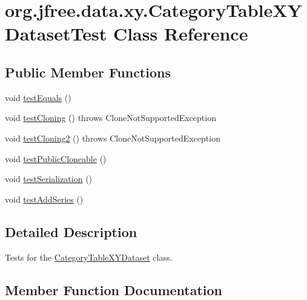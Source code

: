 \hypertarget{classorg_1_1jfree_1_1data_1_1xy_1_1_category_table_x_y_dataset_test}{}\section{org.\+jfree.\+data.\+xy.\+Category\+Table\+X\+Y\+Dataset\+Test Class Reference}
\label{classorg_1_1jfree_1_1data_1_1xy_1_1_category_table_x_y_dataset_test}
\subsection*{Public Member Functions}
\begin{DoxyCompactItemize}
\item 
void \mbox{\hyperlink{classorg_1_1jfree_1_1data_1_1xy_1_1_category_table_x_y_dataset_test_a7ea4c2c636b706dbb6fc170e378856d3}{test\+Equals}} ()
\item 
void \mbox{\hyperlink{classorg_1_1jfree_1_1data_1_1xy_1_1_category_table_x_y_dataset_test_ad630cc41e4f3eb5fa92eadc2932a1e6d}{test\+Cloning}} ()  throws Clone\+Not\+Supported\+Exception 
\item 
void \mbox{\hyperlink{classorg_1_1jfree_1_1data_1_1xy_1_1_category_table_x_y_dataset_test_afb8442da695ebf41623b15048c346636}{test\+Cloning2}} ()  throws Clone\+Not\+Supported\+Exception 
\item 
void \mbox{\hyperlink{classorg_1_1jfree_1_1data_1_1xy_1_1_category_table_x_y_dataset_test_a11da8afdff4ec29bc3204274ace35ec5}{test\+Public\+Cloneable}} ()
\item 
void \mbox{\hyperlink{classorg_1_1jfree_1_1data_1_1xy_1_1_category_table_x_y_dataset_test_a8c70eb63de12c98e15b171a80c20a9dc}{test\+Serialization}} ()
\item 
void \mbox{\hyperlink{classorg_1_1jfree_1_1data_1_1xy_1_1_category_table_x_y_dataset_test_a33862ec302a26bde65c27c9aa3499363}{test\+Add\+Series}} ()
\end{DoxyCompactItemize}


\subsection{Detailed Description}
Tests for the \mbox{\hyperlink{classorg_1_1jfree_1_1data_1_1xy_1_1_category_table_x_y_dataset}{Category\+Table\+X\+Y\+Dataset}} class. 

\subsection{Member Function Documentation}
\mbox{\label{classorg_1_1jfree_1_1data_1_1xy_1_1_category_table_x_y_dataset_test_a33862ec302a26bde65c27c9aa3499363}} 
